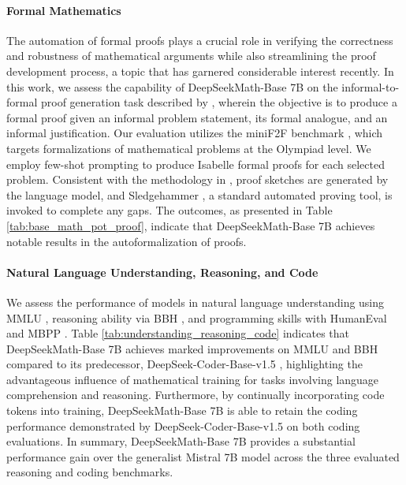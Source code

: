 \begin{itemize}[topsep=0pt]
\paragraph{Formal Mathematics}

The automation of formal proofs plays a crucial role in verifying the correctness and robustness of mathematical arguments while also streamlining the proof development process, a topic that has garnered considerable interest recently. In this work, we assess the capability of DeepSeekMath-Base 7B on the informal-to-formal proof generation task described by \citep{dsp_proof}, wherein the objective is to produce a formal proof given an informal problem statement, its formal analogue, and an informal justification. Our evaluation utilizes the miniF2F benchmark \citep{minif2f}, which targets formalizations of mathematical problems at the Olympiad level. We employ few-shot prompting to produce Isabelle formal proofs for each selected problem. Consistent with the methodology in \cite{dsp_proof}, proof sketches are generated by the language model, and Sledgehammer \citep{sledgehammer}, a standard automated proving tool, is invoked to complete any gaps. The outcomes, as presented in Table \ref{tab:base_math_pot_proof}, indicate that DeepSeekMath-Base 7B achieves notable results in the autoformalization of proofs.

\paragraph{Natural Language Understanding, Reasoning, and Code}

We assess the performance of models in natural language understanding using MMLU \citep{mmlu}, reasoning ability via BBH \citep{bbh}, and programming skills with HumanEval \citep{codex} and MBPP \citep{mbpp}. Table \ref{tab:understanding_reasoning_code} indicates that DeepSeekMath-Base 7B achieves marked improvements on MMLU and BBH compared to its predecessor, DeepSeek-Coder-Base-v1.5 \citep{deepseek-coder}, highlighting the advantageous influence of mathematical training for tasks involving language comprehension and reasoning. Furthermore, by continually incorporating code tokens into training, DeepSeekMath-Base 7B is able to retain the coding performance demonstrated by DeepSeek-Coder-Base-v1.5 on both coding evaluations. In summary, DeepSeekMath-Base 7B provides a substantial performance gain over the generalist Mistral 7B model \citep{mistral} across the three evaluated reasoning and coding benchmarks.


\end{itemize}
